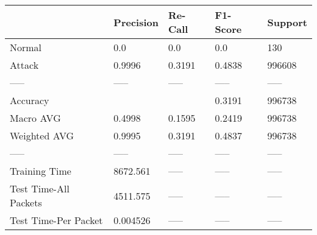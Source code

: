 \begin{tabular}{lllll}
\toprule
{} & Precision & Re-Call & F1-Score & Support \\
\midrule
Normal                &       0.0 &     0.0 &      0.0 &     130 \\
Attack                &    0.9996 &  0.3191 &   0.4838 &  996608 \\
-----                 &     ----- &   ----- &    ----- &   ----- \\
Accuracy              &           &         &   0.3191 &  996738 \\
Macro AVG             &    0.4998 &  0.1595 &   0.2419 &  996738 \\
Weighted AVG          &    0.9995 &  0.3191 &   0.4837 &  996738 \\
-----                 &     ----- &   ----- &    ----- &   ----- \\
Training Time         &  8672.561 &   ----- &    ----- &   ----- \\
Test Time-All Packets &  4511.575 &   ----- &    ----- &   ----- \\
Test Time-Per Packet  &  0.004526 &   ----- &    ----- &   ----- \\
\bottomrule
\end{tabular}
